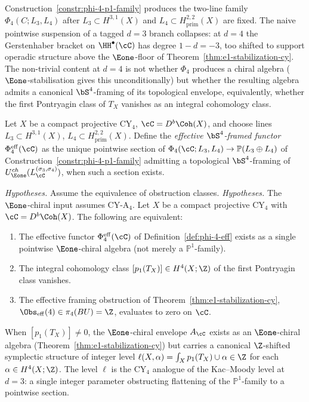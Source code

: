 Construction~\ref{constr:phi-4-p1-family} produces the two-line family
\(\Phi_4(C;L_3,L_4)\) after \(L_3\subset H^{3,1}(X)\) and
\(L_4\subset H^{2,2}_{\mathrm{prim}}(X)\) are fixed. The naive pointwise suspension of
a tagged $d = 3$ branch collapses: at $d = 4$ the Gerstenhaber
bracket on $\HH^\bullet(\cC)$ has degree $1 - d = -3$, too shifted to
support operadic structure above the $\Eone$-floor of
Theorem~\ref{thm:e1-stabilization-cy}. The non-trivial content at $d = 4$ is
not whether $\Phi_4$ produces a chiral algebra ($\Eone$-stabilisation gives
this unconditionally) but whether the resulting algebra admits a canonical
$\bS^4$-framing of its topological envelope, equivalently, whether the
first Pontryagin class of $T_X$ vanishes as an integral cohomology class.

\begin{definition}
\label{def:phi-4-eff}
Let \(X\) be a compact projective CY${}_4$, \(\cC=D^b\Coh(X)\), and choose
lines \(L_3\subset H^{3,1}(X)\), \(L_4\subset H^{2,2}_{\mathrm{prim}}(X)\).
Define the
\emph{effective $\bS^4$-framed functor}
$\Phi_4^{\mathrm{eff}}(\cC)$ as the unique pointwise section of
\(\Phi_4(\cC;L_3,L_4) \to \mathbb{P}(L_3\oplus L_4)\) of
Construction~\ref{constr:phi-4-p1-family} admitting a topological
$\bS^4$-framing of $U^{ch}_{\Eone}(L^{(\sigma_3, \sigma_4)}_\cC)$, when such
a section exists.
\end{definition}

\begin{theorem}[{\texorpdfstring{$\bS^4$}{S-4}-framing vanishes iff \texorpdfstring{$[p_1(T_X)] = 0$}{[p-1(T-X)] = 0}}]
\label{thm:phi-4-eff-p1-vanishing}
\noindent\emph{Hypotheses.} Assume the equivalence of obstruction classes.
\noindent\emph{Hypotheses.} The $\Eone$-chiral input assumes CY-A$_4$.
Let $X$ be a compact projective CY${}_4$ with $\cC = D^b\Coh(X)$. The
following are equivalent:
\begin{enumerate}[label=\textup{(\roman*)}]
 \item The effective functor $\Phi_4^{\mathrm{eff}}(\cC)$ of
 Definition~\ref{def:phi-4-eff} exists as a single pointwise $\Eone$-chiral
 algebra \textup{(}not merely a $\mathbb{P}^1$-family\textup{)}.
 \item The integral cohomology class $[p_1(T_X)] \in H^4(X; \Z)$ of the first
 Pontryagin class vanishes.
 \item The effective framing obstruction of
 Theorem~\ref{thm:e1-stabilization-cy},
 $\Obs_{\mathrm{eff}}(4) \in \pi_4(BU) = \Z$, evaluates to zero on $\cC$.
\end{enumerate}
When $[p_1(T_X)] \neq 0$, the $\Eone$-chiral envelope $A_\cC$ exists as an
$\Eone$-chiral algebra \textup{(}Theorem~\ref{thm:e1-stabilization-cy}\textup{)}
but carries a canonical $\Z$-shifted symplectic structure of integer level
$\ell(X, \alpha) = \int_X p_1(T_X) \cup \alpha \in \Z$ for each
$\alpha \in H^4(X; \Z)$. The level $\ell$ is the CY${}_4$ analogue of the
Kac--Moody level at $d = 3$: a single integer parameter obstructing
flattening of the $\mathbb{P}^1$-family to a pointwise section.
\end{theorem}

